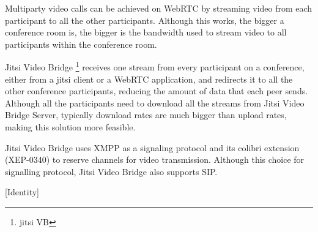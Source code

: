 	
	Multiparty video calls can be achieved on \ac{WebRTC} by streaming video from each participant to all the other participants. Although this works, the bigger a conference room is, the bigger is the bandwidth used to stream video to all participants within the conference room.

	Jitsi Video Bridge \footnote{jitsi VB} receives one stream from every participant on a conference, either from a jitsi client or a \ac{WebRTC} application, and redirects it to all the other conference participants, reducing the amount of data that each peer sends. Although all the participants need to download all the streams from Jitsi Video Bridge Server, typically download rates are much bigger than upload rates, making this solution more feasible.

	Jitsi Video Bridge uses \ac{XMPP} as a signaling protocol and its colibri extension (XEP-0340) to reserve channels for video transmission. Although this choice for signalling protocol, Jitsi Video Bridge also supports \ac{SIP}.


  {\color{red}[Identity]}



